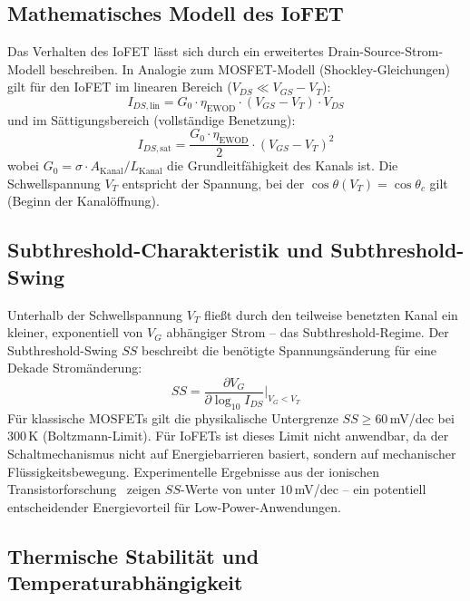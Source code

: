 ﻿\documentclass[a4paper,12pt]{scrreprt}
\theoremstyle{definition}
\begin{document}
\subsection{Mathematisches Modell des IoFET}

Das Verhalten des IoFET lässt sich durch ein erweitertes Drain-Source-Strom-Modell
beschreiben. In Analogie zum MOSFET-Modell (Shockley-Gleichungen) gilt für den
IoFET im linearen Bereich ($V_{DS} \ll V_{GS} - V_T$):
\begin{equation}
	I_{DS,\mathrm{lin}} = G_0 \cdot \eta_{\mathrm{EWOD}} \cdot (V_{GS} - V_T) \cdot V_{DS}
	\label{eq:iofet_linear}
\end{equation}
und im Sättigungsbereich (vollständige Benetzung):
\begin{equation}
	I_{DS,\mathrm{sat}} = \frac{G_0 \cdot \eta_{\mathrm{EWOD}}}{2} \cdot (V_{GS} - V_T)^2
	\label{eq:iofet_saettigung}
\end{equation}
wobei $G_0 = \sigma \cdot A_{\mathrm{Kanal}} / L_{\mathrm{Kanal}}$ die Grundleitfähigkeit
des Kanals ist. Die Schwellspannung $V_T$ entspricht der Spannung, bei der
$\cos\theta(V_T) = \cos\theta_c$ gilt (Beginn der Kanalöffnung).

\subsection{Subthreshold-Charakteristik und Subthreshold-Swing}

Unterhalb der Schwellspannung $V_T$ fließt durch den teilweise benetzten
Kanal ein kleiner, exponentiell von $V_G$ abhängiger Strom -- das
Subthreshold-Regime. Der Subthreshold-Swing $SS$ beschreibt die benötigte
Spannungsänderung für eine Dekade Stromänderung:
\begin{equation}
	SS = \frac{\partial V_G}{\partial \log_{10} I_{DS}}
	\bigg|_{V_G < V_T}
	\label{eq:subthreshold_swing}
\end{equation}
Für klassische MOSFETs gilt die physikalische Untergrenze
$SS \geq 60$\,mV/dec bei 300\,K (Boltzmann-Limit). Für IoFETs ist dieses
Limit nicht anwendbar, da der Schaltmechanismus nicht auf Energiebarrieren
basiert, sondern auf mechanischer Flüssigkeitsbewegung. Experimentelle
Ergebnisse aus der ionischen Transistorforschung~\cite{xu2021} zeigen
$SS$-Werte von unter $10$\,mV/dec -- ein potentiell entscheidender
Energievorteil für Low-Power-Anwendungen.

\subsection{Thermische Stabilität und Temperaturabhängigkeit}
\end{document}
